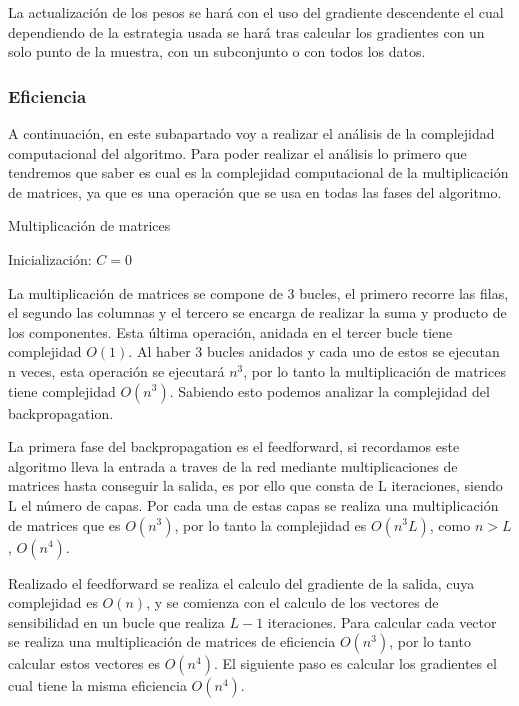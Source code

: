 La actualización de los pesos se hará con el uso del gradiente descendente el cual dependiendo de la estrategia usada se hará tras calcular los gradientes con un solo punto de la muestra, con un subconjunto o con todos los datos.

\subsubsection{Eficiencia}

A continuación, en este subapartado voy a realizar el análisis de la complejidad computacional del algoritmo. Para poder realizar el análisis lo primero que tendremos que saber es cual es la complejidad computacional de la multiplicación de matrices, ya que es una operación que se usa en todas las fases del algoritmo.

\begin{algorithm}[H]
   \caption{Multiplicación de matrices}
   Inicialización: $C = 0$\\
\end{algorithm}

La multiplicación de matrices se compone de 3 bucles, el primero recorre las filas, el segundo las columnas y el tercero se encarga de realizar la suma y producto de los componentes. Esta última operación, anidada en el tercer bucle tiene complejidad $O(1)$. Al haber 3 bucles anidados y cada uno de estos se ejecutan n veces, esta operación se ejecutará $n^{3}$, por lo tanto la multiplicación de matrices tiene complejidad $O(n^3)$. Sabiendo esto podemos analizar la complejidad del backpropagation.

 La primera fase del backpropagation es el feedforward, si recordamos este algoritmo lleva la entrada a traves de la red mediante multiplicaciones de matrices hasta conseguir la salida, es por ello que consta de L iteraciones, siendo L el número de capas. Por cada una de estas capas se realiza una multiplicación de matrices que es $O(n^3)$, por lo tanto la complejidad es $O(n^3L)$, como $n>L$, $O(n^4)$.

Realizado el feedforward se realiza el calculo del gradiente de la salida, cuya complejidad es $O(n)$, y se comienza con el calculo de los vectores de sensibilidad en un bucle que realiza $L-1$ iteraciones. Para calcular cada vector se realiza una multiplicación de matrices de eficiencia $O(n^3)$, por lo tanto calcular estos vectores es $O(n^4)$. El siguiente paso es calcular los gradientes el cual tiene la misma eficiencia $O(n^4)$. 

